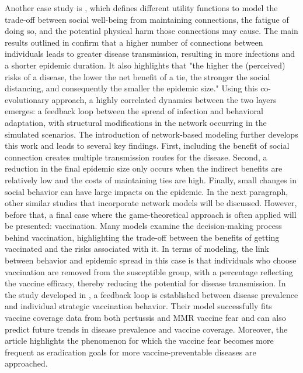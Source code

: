 Another case study is \cite{Nunner2021}, which defines different utility functions to model the trade-off between social well-being from maintaining connections, the fatigue of doing so, and the potential physical harm those connections may cause. The main results outlined in \cite{Nunner2021} confirm that a higher number of connections between individuals leads to greater disease transmission, resulting in more infections and a shorter epidemic duration. It also highlights that "the higher the (perceived) risks of a disease, the lower the net benefit of a tie, the stronger the social distancing, and consequently the smaller the epidemic size."
Using this co-evolutionary approach, a highly correlated dynamics between the two layers emerges: a feedback loop between the spread of infection and behavioral adaptation, with structural modifications in the network occurring in the simulated scenarios.
The introduction of network-based modeling further develops this work and leads to several key findings. First, including the benefit of social connection creates multiple transmission routes for the disease. Second, a reduction in the final epidemic size only occurs when the indirect benefits are relatively low and the costs of maintaining ties are high. Finally, small changes in social behavior can have large impacts on the epidemic.
In the next paragraph, other similar studies that incorporate network models will be discussed. However, before that, a final case where the game-theoretical approach is often applied will be presented: vaccination. Many models examine the decision-making process behind vaccination, highlighting the trade-off between the benefits of getting vaccinated and the risks associated with it.
In terms of modeling, the link between behavior and epidemic spread in this case is that individuals who choose vaccination are removed from the susceptible group, with a percentage reflecting the vaccine efficacy, thereby reducing the potential for disease transmission. In the study developed in \cite{Bauch_2012_game}, a feedback loop is established between disease prevalence and individual strategic vaccination behavior. Their model successfully fits vaccine coverage data from both pertussis and MMR vaccine fear and can also predict future trends in disease prevalence and vaccine coverage. 
Moreover, the article highlights the phenomenon for which the vaccine fear becomes more frequent as eradication goals for more vaccine-preventable diseases are approached.

